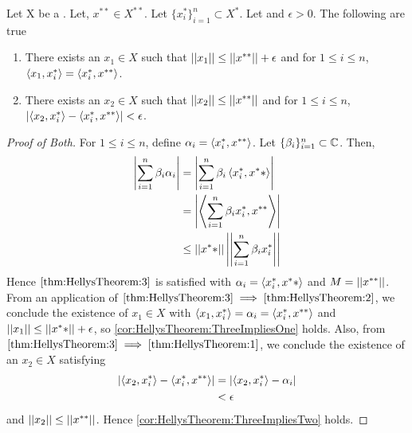 \begin{cor}
    \label{cor:HellysTheorem}
    Let X be a \SeminormedSpace.
    Let, $x^{**} \in X^{**}$.
    Let $\{x_i^*\}_{i=1}^n \subset X^*$.
    Let and $\epsilon > 0$. 
    The following are true
    \begin{enumerate}[label=(\roman*), ref={\ref{cor:HellysTheorem}~\roman*}]
        \item 
        \label{cor:HellysTheorem:ThreeImpliesOne}
        There exists an $x_1 \in X$ 
        such that $\left|\left| x_1 \right|\right| \leq \left|\left| x^{**} \right|\right|+\epsilon$ 
        and for $1 \leq i \leq n$, 
        $\left\langle x_1,x_i^* \right\rangle = \left\langle x_i^*,x^{**} \right\rangle$.  
        \item 
        \label{cor:HellysTheorem:ThreeImpliesTwo}
        There exists an $x_2 \in X$ 
        such that $\left|\left| x_2 \right|\right| \leq \left|\left| x^{**} \right|\right|$ 
        and for $1 \leq i \leq n$, 
        $\left| \left\langle x_2,x_i^* \right\rangle-\left\langle x_i^*,x^{**} \right\rangle \right| < \epsilon$. 
    \end{enumerate} 
    \begin{proof}[Proof of Both]
    For $1 \leq i \leq n$, define $\alpha_i = \left\langle x_i^*, x^{**} \right\rangle$. 
    Let $\{\beta_i\}_{i=1}^n \subset \mathbb{C}$. 
    Then, 
    \begin{align*}
    \left| \sum\limits_{i=1}^n \beta_i \alpha_i \right|
    & = \left| \sum\limits_{i=1}^n \beta_i \left\langle x_i^*, x^** \right\rangle \right|\\
    & = \left| \left\langle \sum\limits_{i=1}^n \beta_i x_i^*, x^{**} \right\rangle \right|\\
    & \leq \left|\left| x^** \right|\right| \left|\left| \sum\limits_{i=1}^n \beta_i x_i^* \right|\right|
    \end{align*}
    Hence $\ref{thm:HellysTheorem:3}$ is satisfied with $\alpha_i=\left\langle x_i^*, x^** \right\rangle$ 
    and $M = \left|\left| x^{**} \right|\right|$. 
    From an application of 
    $\ref{thm:HellysTheorem:3} \implies \ref{thm:HellysTheorem:2}$, 
    we conclude the existence of 
    $x_{1} \in X$ 
    with 
    $\left\langle x_1, x_i^* \right\rangle = \alpha_i = \left\langle x_i^*, x^{**} \right\rangle$ 
    and 
    $\left|\left| x_1 \right|\right| \leq \left|\left| x^** \right|\right|+\epsilon$, 
    so \ref{cor:HellysTheorem:ThreeImpliesOne} holds.
    Also, from 
    $\ref{thm:HellysTheorem:3} \implies \ref{thm:HellysTheorem:1}$, 
    we conclude the existence of an 
    $x_2 \in X$ 
    satisfying
    \begin{align*}
        \left| \left\langle x_2, x_i^* \right\rangle - \left\langle x_i^*, x^{**} \right\rangle \right| 
        & = \left| \left\langle x_2, x_i^* \right\rangle - \alpha_i \right| \\
        & < \epsilon
    \end{align*}
    and $\left|\left| x_2 \right|\right| \leq \left|\left| x^{**} \right|\right|$. 
    Hence \ref{cor:HellysTheorem:ThreeImpliesTwo} holds.
    \end{proof}
\end{cor} 

